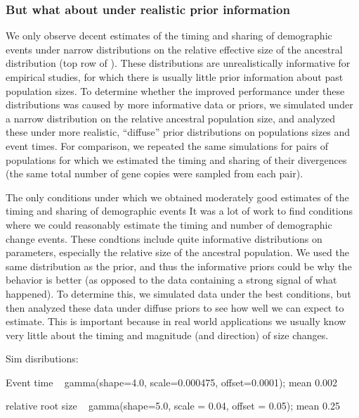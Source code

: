 \ifembed{

}{}

\ifembed{

}{}


\subsubsection{But what about under realistic prior information}

We only observe decent estimates of the timing and sharing of demographic
events under narrow distributions on the relative effective size of the
ancestral distribution
(top row of \figs
{}).
These distributions are unrealistically informative for empirical studies, for
which there is usually little prior information about past population sizes.
To determine whether the improved performance under these distributions
was caused by more informative data or priors, we simulated
\datasets under a narrow distribution on the relative ancestral
population size, and analyzed these \datasets under
more realistic, ``diffuse'' prior distributions on populations sizes
and event times.
For comparison, we repeated the same simulations for pairs of populations for
which we estimated the timing and sharing of their divergences (the same total
number of gene copies were sampled from each pair).

The only conditions under which we obtained moderately good estimates of the
timing and sharing of demographic events
It was a lot of work to find conditions where we could reasonably estimate
the timing and number of demographic change events.
These condtions include quite informative distributions on parameters,
especially the relative size of the ancestral population.
We used the same distribution as the prior, and thus the informative priors
could be why the behavior is better (as opposed to the data containing a strong
signal of what happened).
To determine this, we simulated data under the best conditions,
but then analyzed these data under diffuse priors to see how
well we can expect to estimate.
This is important because in real world applications we usually know very
little about the timing and magnitude (and direction) of size changes.

Sim disributions:

Event time ~ gamma(shape=4.0, scale=0.000475, offset=0.0001); mean 0.002

relative root size ~ gamma(shape=5.0, scale = 0.04, offset = 0.05); mean 0.25

